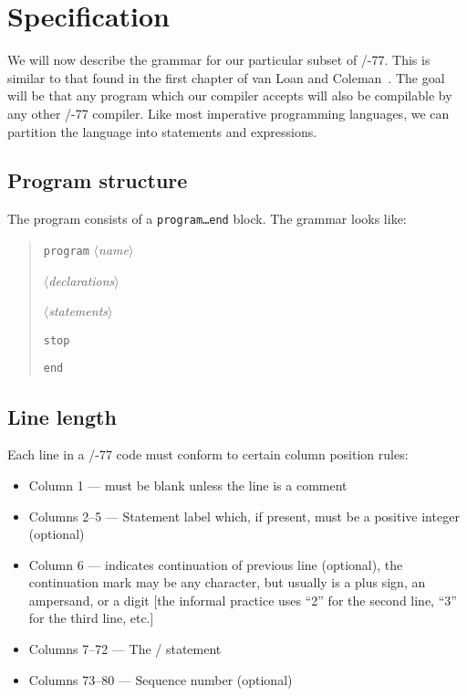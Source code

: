 \section{Specification}
We will now describe the grammar for our particular subset of \FORTRAN/-77.
This is similar to that found in the first chapter of van Loan and
Coleman~\cite{vanloan1987handbook}. The goal will be that any program
which our compiler accepts will also be compilable by any other \FORTRAN/-77 compiler.
Like most imperative programming languages, we can partition the
language into statements and expressions.

\subsection{Program structure}
The program consists of a \texttt{program\dots end} block. The grammar
looks like:

\begin{quotation}
\noindent\texttt{program} $\langle$\textit{name\/}$\rangle$

$\langle$\textit{declarations\/}$\rangle$

$\langle$\textit{statements\/}$\rangle$

\noindent\texttt{stop}

\noindent\texttt{end}
\end{quotation}

\subsection{Line length}
Each line in a \FORTRAN/-77 code must conform to certain column position
rules:
\begin{itemize}
\item Column 1 --- must be blank unless the line is a comment
\item Columns 2--5 --- Statement label which, if present, must be a
  positive integer (optional)
\item Column 6 --- indicates continuation of previous line (optional),
  the continuation mark may be any character, but usually is a plus
  sign, an ampersand, or a digit [the informal practice uses
  ``2'' for the second line, ``3'' for the third line, etc.]
\item Columns 7--72 --- The \FORTRAN/ statement
\item Columns 73--80 --- Sequence number (optional)
\end{itemize}

